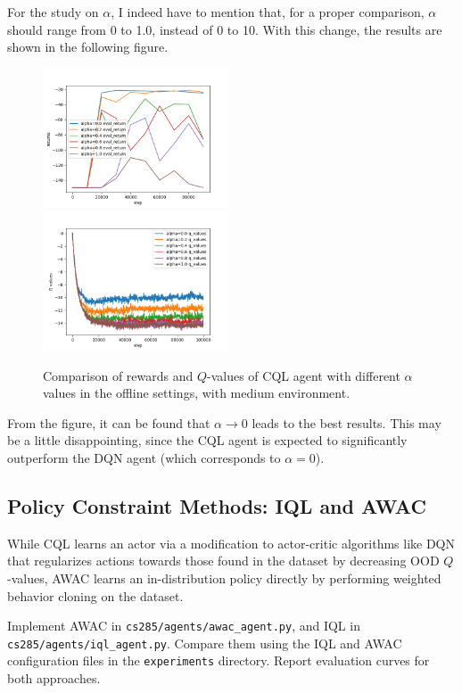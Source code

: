\documentclass{article}
\begin{document}
For the study on $\alpha$, I indeed have to mention that, for a proper comparison, $\alpha$ should range from 0 to 1.0, instead of 0 to 10. With this change, the results are shown in the following figure.

\begin{figure}[H]
    \centering
    \includegraphics[width=0.49\textwidth]{../report/assets/4.1-alpha.png}~
    \includegraphics[width=0.49\textwidth]{../report/assets/4.1-alpha-q.png}
    \caption{Comparison of rewards and $Q$-values of CQL agent with different $\alpha$ values in the offline settings, with medium environment.}
\end{figure}

From the figure, it can be found that $\alpha\to 0$ leads to the best results. This may be a little disappointing, since the CQL agent is expected to significantly outperform the DQN agent (which corresponds to $\alpha=0$).  

\subsection{Policy Constraint Methods: IQL and AWAC}
While CQL learns an actor via a modification to actor-critic algorithms like DQN that regularizes actions towards those found in the dataset by decreasing OOD $Q$-values, AWAC learns an in-distribution policy directly by performing weighted behavior cloning on the dataset.

Implement AWAC in \verb+cs285/agents/awac_agent.py+, and IQL in \verb+cs285/agents/iql_agent.py+. Compare them using the IQL and AWAC configuration files in the \verb+experiments+ directory. Report evaluation curves for both approaches.
\end{document}
